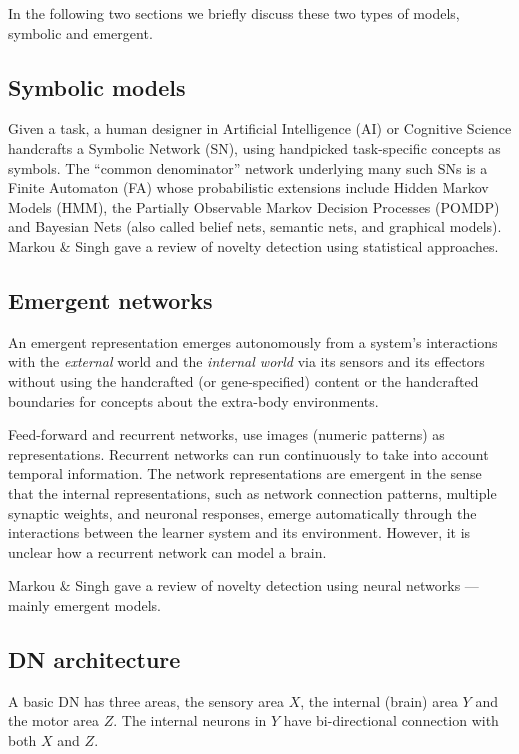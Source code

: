 \documentclass[conference]{IEEEtran}
\begin{document}
In the following two sections we briefly discuss these two types of models, symbolic and emergent. 

\subsection{Symbolic models}
Given a task, a human designer in Artificial Intelligence (AI) \cite{Soar87,Hawkins09} or Cognitive Science \cite{Anderson93,Tenenbaum06} handcrafts a Symbolic Network (SN), using handpicked task-specific 
concepts as symbols.   The ``common denominator'' network underlying many such SNs is a Finite Automaton (FA) whose probabilistic extensions include  
 Hidden Markov Models (HMM), the Partially Observable Markov Decision Processes (POMDP)
and Bayesian Nets (also called belief nets, semantic nets, and graphical models). Markou \& Singh \cite{Markou03s} gave a review of novelty detection using statistical approaches. 

\subsection{Emergent networks}

An emergent representation emerges autonomously from a system's interactions with the {\em external} world and
the {\em internal world} via its sensors and
its effectors without using the handcrafted (or gene-specified) content or the handcrafted 
boundaries for concepts about the extra-body environments.

Feed-forward \cite{Serre07,Rogers08} and recurrent \cite{Hinton06,Yamashita08} networks, use 
images (numeric patterns) as representations.    Recurrent networks can run continuously to take into account temporal information.  The network representations are emergent in the sense that the internal
representations, such as network connection patterns, multiple synaptic weights, and neuronal responses, emerge automatically 
through the interactions between the learner system and its environment.   
However, it is unclear how a recurrent network can model a brain.  

Markou \& Singh \cite{Markou03} gave a review of novelty detection using neural networks --- mainly 
emergent models. 

\subsection{DN architecture}

A basic DN has three areas, the sensory area $X$, the internal (brain) area $Y$ and the motor area $Z$.  The internal neurons in $Y$ have bi-directional connection with both $X$ and $Z$.  
\end{document}
